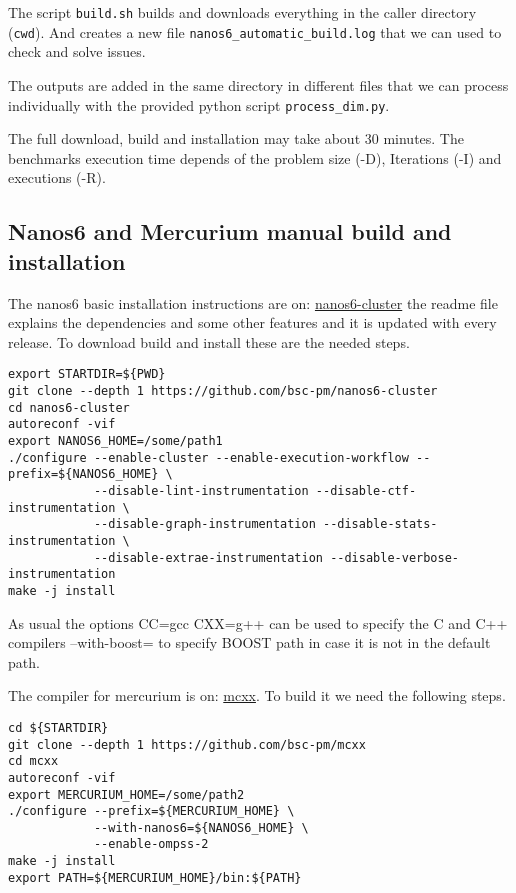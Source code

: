 \documentclass{article}
\newcommand{\code}[1]{\texttt{#1}}
\begin{document}
The script \code{build.sh} builds and downloads everything in the
caller directory (\code{cwd}). And creates a new file
\code{nanos6\_automatic\_build.log} that we can used to check and
solve issues.

The outputs are added in the same directory in different files that we
can process individually with the provided python script
\code{process\_dim.py}.

The full download, build and installation may take about 30
minutes. The benchmarks execution time depends of the problem size
(-D), Iterations (-I) and executions (-R).

\subsection{Nanos6 and Mercurium manual build and installation}

The nanos6 basic installation instructions are on:
\href{https://github.com/bsc-pm/nanos6-cluster}{nanos6-cluster} the
readme file explains the dependencies and some other features and it
is updated with every release. To download build and install these are
the needed steps.

\begin{lstlisting}
export STARTDIR=${PWD}
git clone --depth 1 https://github.com/bsc-pm/nanos6-cluster
cd nanos6-cluster
autoreconf -vif
export NANOS6_HOME=/some/path1
./configure --enable-cluster --enable-execution-workflow --prefix=${NANOS6_HOME} \
            --disable-lint-instrumentation --disable-ctf-instrumentation \
            --disable-graph-instrumentation --disable-stats-instrumentation \
            --disable-extrae-instrumentation --disable-verbose-instrumentation
make -j install
\end{lstlisting}

As usual the options CC=gcc CXX=g++ can be used to specify the C and
C++ compilers --with-boost= to specify BOOST path in case it is not in
the default path.

The compiler for mercurium is on:
\href{https://github.com/bsc-pm/mcxx}{mcxx}. To build it we need the
following steps.

\begin{lstlisting}
cd ${STARTDIR}
git clone --depth 1 https://github.com/bsc-pm/mcxx
cd mcxx
autoreconf -vif
export MERCURIUM_HOME=/some/path2
./configure --prefix=${MERCURIUM_HOME} \
            --with-nanos6=${NANOS6_HOME} \
            --enable-ompss-2
make -j install
export PATH=${MERCURIUM_HOME}/bin:${PATH}
\end{lstlisting}
\end{document}
